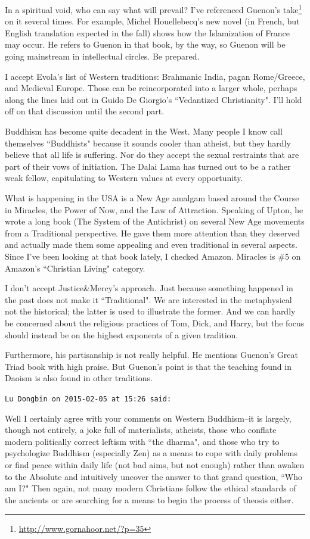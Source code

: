 \begin{footnotesize}
\begin{sffamily}
In a spiritual void, who can say what will prevail? I've referenced Guenon's take\footnote{\url{http://www.gornahoor.net/?p=35}} on it several times. For example, Michel Houellebecq's new novel (in French, but English translation expected in the fall) shows how the Islamization of France may occur. He refers to Guenon in that book, by the way, so Guenon will be going mainstream in intellectual circles. Be prepared.

I accept Evola's list of Western traditions: Brahmanic India, pagan Rome/Greece, and Medieval Europe. Those can be reincorporated into a larger whole, perhaps along the lines laid out in Guido De Giorgio's ``Vedantized Christianity". I'll hold off on that discussion until the second part.

Buddhism has become quite decadent in the West. Many people I know call themselves ``Buddhists" because it sounds cooler than atheist, but they hardly believe that all life is suffering. Nor do they accept the sexual restraints that are part of their vows of initiation. The Dalai Lama has turned out to be a rather weak fellow, capitulating to Western values at every opportunity.

What is happening in the USA is a New Age amalgam based around the Course in Miracles, the Power of Now, and the Law of Attraction. Speaking of Upton, he wrote a long book (The System of the Antichrist) on several New Age movements from a Traditional perspective. He gave them more attention than they deserved and actually made them some appealing and even traditional in several aspects. Since I've been looking at that book lately, I checked Amazon. Miracles is \#5 on Amazon's ``Christian Living" category.

I don't accept Justice\&Mercy's approach. Just because something happened in the past does not make it ``Traditional". We are interested in the metaphysical not the historical; the latter is used to illustrate the former. And we can hardly be concerned about the religious practices of Tom, Dick, and Harry, but the focus should instead be on the highest exponents of a given tradition.

Furthermore, his partisanship is not really helpful. He mentions Guenon's Great Triad book with high praise. But Guenon's point is that the teaching found in Daoism is also found in other traditions.


\hfill

\texttt{Lu Dongbin on 2015-02-05 at 15:26 said: }

Well I certainly agree with your comments on Western Buddhism–it is largely, though not entirely, a joke full of materialists, atheists, those who conflate modern politically correct leftism with ``the dharma", and those who try to psychologize Buddhism (especially Zen) as a means to cope with daily problems or find peace within daily life (not bad aims, but not enough) rather than awaken to the Absolute and intuitively uncover the answer to that grand question, ``Who am I?" Then again, not many modern Christians follow the ethical standards of the ancients or are searching for a means to begin the process of theosis either.


\end{sffamily}
\end{footnotesize}

